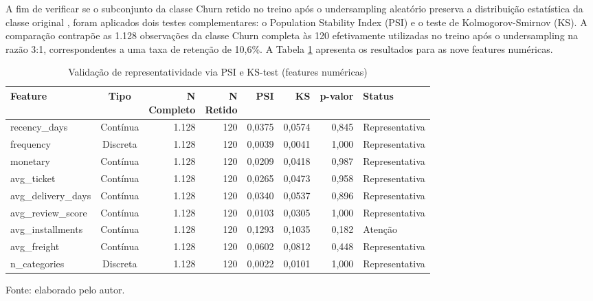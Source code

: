 A fim de verificar se o subconjunto da classe Churn retido no treino após o undersampling aleatório preserva a distribuição estatística da classe original \cite{he2009}, foram aplicados dois testes complementares: o Population Stability Index (PSI) e o teste de Kolmogorov-Smirnov (KS). A comparação contrapõe as 1.128 observações da classe Churn completa às 120 efetivamente utilizadas no treino após o undersampling na razão 3:1, correspondentes a uma taxa de retenção de 10,6\%. A Tabela \ref{tab:psi-ks} apresenta os resultados para as nove features numéricas.

\begin{table}[htbp]
\ABNTEXfontereduzida
\SingleSpacing
\caption{Validação de representatividade via PSI e KS-test (features numéricas)}
\label{tab:psi-ks}
\centering
\scriptsize
\setlength{\tabcolsep}{4pt}
\begin{tabular}{@{}lcrrrrrl@{}}
\hline
\textbf{Feature} & \textbf{Tipo} & \shortstack[r]{\textbf{N}\\\textbf{Completo}} & \shortstack[r]{\textbf{N}\\\textbf{Retido}} & \textbf{PSI} & \textbf{KS} & \textbf{p-valor} & \textbf{Status} \\
\hline
recency\_days       & Contínua & 1.128 & 120 & 0,0375 & 0,0574 & 0,845 & Representativa \\
frequency           & Discreta & 1.128 & 120 & 0,0039 & 0,0041 & 1,000 & Representativa \\
monetary            & Contínua & 1.128 & 120 & 0,0209 & 0,0418 & 0,987 & Representativa \\
avg\_ticket         & Contínua & 1.128 & 120 & 0,0265 & 0,0473 & 0,958 & Representativa \\
avg\_delivery\_days & Contínua & 1.128 & 120 & 0,0340 & 0,0537 & 0,896 & Representativa \\
avg\_review\_score  & Contínua & 1.128 & 120 & 0,0103 & 0,0305 & 1,000 & Representativa \\
avg\_installments   & Contínua & 1.128 & 120 & 0,1293 & 0,1035 & 0,182 & Atenção \\
avg\_freight        & Contínua & 1.128 & 120 & 0,0602 & 0,0812 & 0,448 & Representativa \\
n\_categories       & Discreta & 1.128 & 120 & 0,0022 & 0,0101 & 1,000 & Representativa \\
\hline
\end{tabular}
\begin{flushleft}
	\ABNTEXfontereduzida
	\SingleSpacing
	Fonte: elaborado pelo autor.
\end{flushleft}
\end{table}

